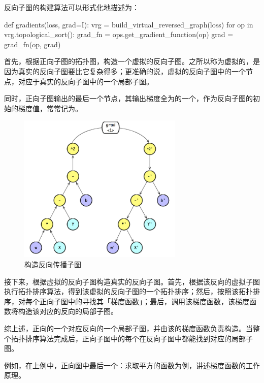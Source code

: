 \begin{content}
反向子图的构建算法可以形式化地描述为：

\begin{leftbar}
\begin{python}
def gradients(loss, grad=I):
  vrg = build_virtual_reversed_graph(loss)
  for op in vrg.topological_sort():
    grad_fn = ops.get_gradient_function(op)
    grad = grad_fn(op, grad)
\end{python}
\end{leftbar}

首先，根据正向子图的拓扑图，构造一个虚拟的反向子图。之所以称为虚拟的，是因为真实的反向子图要比它复杂得多；更准确的说，虚拟的反向子图中的一个节点，对应于真实的反向子图中的一个局部子图。

同时，正向子图输出的最后一个节点，其输出梯度全为的一个，作为反向子图的初始的梯度值，常常记为。

\begin{figure}[!htbp]
\centering
\includegraphics[width=0.7\textwidth]{figures/bp-back-graph-construction.png}
\caption{构造反向传播子图}
 \label{fig:bp-back-graph-construction}
\end{figure}

接下来，根据虚拟的反向子图构造真实的反向子图。首先，根据该反向的虚拟子图执行拓扑排序算法，得到该虚拟的反向子图的一个拓扑排序；然后，按照该拓扑排序，对每个正向子图中的寻找其「梯度函数」；最后，调用该梯度函数，该梯度函数将构造该对应的反向的局部子图。

综上述，正向的一个对应反向的一个局部子图，并由该的梯度函数负责构造。当整个拓扑排序算法完成后，正向子图中的每个在反向子图中都能找到对应的局部子图。

例如，在上例中，正向图中最后一个：求取平方的函数为例，讲述梯度函数的工作原理。


\end{content}
